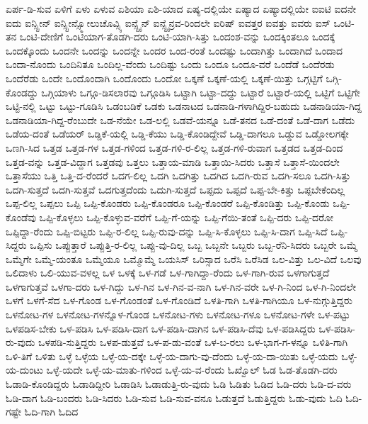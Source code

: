 {ಏರ್ಪ-ಡಿ-ಸುವ
ಏಳಿಗೆ
ಏಳು
ಏಳುವ
ಏಶಿಯಾ
ಏಶಿ-ಯಾದ
ಏಷ್ಯ-ದಲ್ಲಿಯೇ
ಏಷ್ಯಾದ
ಏಷ್ಯಾದಲ್ಲಿಯೇ
ಐಐಟಿ
ಐದನೇ
ಐದು
ಐನ್ಸ್ಟೀನ್
ಐನ್ಸ್ಟೀನ್ಸ್ಮೋಲುಚೊವ್ಸ್ಕಿ
ಐನ್ಸ್ಟೈನ್
ಐನ್ಸ್ಟೈನ್ರವ-ರಿಂದಲೇ
ಐರಿಷ್
ಐವತ್ತರ
ಐವತ್ತು
ಐವರು
ಐಸ್
ಒಂಟಿ-ತನ
ಒಂಟಿ-ದೇಣಿಗೆ
ಒಂಟಿಯಾಗ-ತೊಡಗಿ-ದರು
ಒಂಟಿ-ಯಾಗಿ-ಸಿತ್ತು
ಒಂದಂಶ-ವನ್ನು
ಒಂದಕ್ಕಿಂತಲೂ
ಒಂದಕ್ಕೆ
ಒಂದಕ್ಕೊಂದು
ಒಂದನೇ
ಒಂದನ್ನು
ಒಂದನ್ನೇ
ಒಂದರ
ಒಂದ-ರಂತೆ
ಒಂದಷ್ಟು
ಒಂದಾಗಿತ್ತು
ಒಂದಾಗಿದೆ
ಒಂದಾದ
ಒಂದಾ-ನೊಂದು
ಒಂದಿನಿತೂ
ಒಂದಿಲ್ಲ-ವೆಂದು
ಒಂದಿಷ್ಟು
ಒಂದು
ಒಂದೂ
ಒಂದೂ-ವರೆ
ಒಂದೆಡೆ
ಒಂದೆರಡು
ಒಂದೆರೆಡು
ಒಂದೇ
ಒಂದೊಂದಾಗಿ
ಒಂದೊಂದು
ಒಂದೋ
ಒಕ್ಕಣೆ
ಒಕ್ಕಣೆ-ಯಲ್ಲಿ
ಒಕ್ಕಣೆ-ಯಿತ್ತು
ಒಗ್ಗಟ್ಟಿಗೆ
ಒಗ್ಗಿ-ಕೊಂಡದ್ದು
ಒಗ್ಗಿಯಾಳು
ಒಗ್ಗೂ-ಡಿಸಲಾರವು
ಒಗ್ಗೂಡಿಸಿ
ಒಟ್ಟಾಗಿ
ಒಟ್ಟಾ-ದದ್ದು
ಒಟ್ಟಾರೆ
ಒಟ್ಟಾರೆ-ಯಲ್ಲಿ
ಒಟ್ಟಿಗೆ
ಒಟ್ಟಿಗೇ
ಒಟ್ಟಿ-ನಲ್ಲಿ
ಒಟ್ಟು
ಒಟ್ಟು-ಗೂಡಿಸಿ
ಒಡಂಬಡಿಕೆ
ಒಡಕು
ಒಡನಾಟದ
ಒಡನಾಡಿ-ಗಳಾಗಿದ್ದಿರ-ಬಹುದು
ಒಡನಾಡಿಯಾ-ಗಿದ್ದ
ಒಡನಾಡಿಯಾ-ಗಿದ್ದ-ರೆಂಬುದೇ
ಒಡ-ನೆಯೇ
ಒಡ-ಲಲ್ಲಿ
ಒಡವೆ-ಯನ್ನೂ
ಒಡೆ-ತನದ
ಒಡೆ-ದಂತೆ
ಒಡೆ-ದಾಗ
ಒಡೆದು
ಒಡೆಯ-ದಂತೆ
ಒಡೆಯರ್
ಒಡ್ಡಿಕೆ-ಯಲ್ಲಿ
ಒಡ್ಡಿ-ಕೆಯು
ಒಡ್ಡಿ-ಕೊಂಡಿದ್ದೇವೆ
ಒಡ್ಡಿ-ದಾಗಲೂ
ಒಡ್ಡುವ
ಒಡ್ಡೋಲಗಕ್ಕೇ
ಒಣಗಿ-ಸಿದ
ಒತ್ತಡ
ಒತ್ತಡ-ಗಳ
ಒತ್ತಡ-ಗಳಿಂದ
ಒತ್ತಡ-ಗಳಿ-ರ-ಲಿಲ್ಲ
ಒತ್ತಡ-ಗಳಿ-ರುವಾಗ
ಒತ್ತಡದ
ಒತ್ತಡ-ದಿಂದ
ಒತ್ತಡ-ವನ್ನು
ಒತ್ತಡ-ವಿದ್ದಾಗ
ಒತ್ತಡವು
ಒತ್ತಲು
ಒತ್ತಾಯ-ಮಾಡಿ
ಒತ್ತಾಯಿ-ಸಿದರು
ಒತ್ತಾಸೆ
ಒತ್ತಾಸೆ-ಯಿಂದಲೇ
ಒತ್ತಾಸೆಯು
ಒತ್ತಿ
ಒತ್ತಿ-ದ-ರೆಂದರೆ
ಒದಗ-ಲಿಲ್ಲ
ಒದಗಿ
ಒದಗಿತ್ತು
ಒದಗಿದ
ಒದಗಿ-ರುವ
ಒದಗಿ-ಸಲೂ
ಒದಗಿ-ಸಿತ್ತು
ಒದಗಿ-ಸುತ್ತದೆ
ಒದಗಿ-ಸುತ್ತವೆ
ಒದಗುತ್ತದೆಂದು
ಒದುಗಿ-ಸುತ್ತದೆ
ಒಪ್ಪದು
ಒಪ್ಪದೆ
ಒಪ್ಪ-ಬೇ-ಕಿತ್ತು
ಒಪ್ಪಬೇಕೆಂದಿಲ್ಲ
ಒಪ್ಪ-ಲಿಲ್ಲ
ಒಪ್ಪಲು
ಒಪ್ಪಿ
ಒಪ್ಪಿ-ಕೊಂಡರು
ಒಪ್ಪಿ-ಕೊಂಡರೂ
ಒಪ್ಪಿ-ಕೊಂಡರೆ
ಒಪ್ಪಿ-ಕೊಂಡಿತ್ತು
ಒಪ್ಪಿ-ಕೊಂಡು
ಒಪ್ಪಿ-ಕೊಂಡೆವು
ಒಪ್ಪಿ-ಕೊಳ್ಳಲು
ಒಪ್ಪಿ-ಕೊಳ್ಳುವ-ವರೆಗೆ
ಒಪ್ಪಿ-ಗೆ-ಯನ್ನು
ಒಪ್ಪಿ-ಗೆಯಿ-ತಂತೆ
ಒಪ್ಪಿ-ದರು
ಒಪ್ಪಿ-ದರೋ
ಒಪ್ಪಿದ್ದಾ-ರೆಂದು
ಒಪ್ಪಿ-ಬಿಟ್ಟರು
ಒಪ್ಪಿ-ರ-ಲಿಲ್ಲ
ಒಪ್ಪಿ-ರುವು-ದನ್ನು
ಒಪ್ಪಿ-ಸಿ-ಕೊಳ್ಳಲು
ಒಪ್ಪಿ-ಸಿ-ದಾಗ
ಒಪ್ಪಿ-ಸಿದೆ
ಒಪ್ಪಿ-ಸಿದ್ದರು
ಒಪ್ಪಿಸು
ಒಪ್ಪುತ್ತಾರೆ
ಒಪ್ಪುತ್ತಿ-ರ-ಲಿಲ್ಲ
ಒಪ್ಪು-ವು-ದಿಲ್ಲ
ಒಬ್ಬ
ಒಬ್ಬನೇ
ಒಬ್ಬರು
ಒಬ್ಬ-ರೆನಿ-ಸಿದರು
ಒಬ್ಬರೇ
ಒಮ್ಮೆ
ಒಮ್ಮೆಗೇ
ಒಮ್ಮೆ-ಯಂತೂ
ಒಮ್ಮೆಯೂ
ಒಮ್ಮೊಮ್ಮೆ
ಒಯಸಿಸ್
ಒರಿಸ್ಸಾದ
ಒರೆಸಿ
ಒರೆಸಿಡ
ಒಲ-ವಿತ್ತು
ಒಲ-ವಿದೆ
ಒಲವು
ಒಲಿದಾಳು
ಒಲಿ-ಯುವ-ವಳಲ್ಲ
ಒಳ
ಒಳಕ್ಕೆ
ಒಳ-ಗಡೆ
ಒಳ-ಗಾಗಿದ್ದಾ-ರೆಂದು
ಒಳ-ಗಾಗಿ-ರುವ
ಒಳಗಾಗುತ್ತದೆ
ಒಳಗಾಗುತ್ತವೆ
ಒಳಗಾ-ದರು
ಒಳ-ಗಿದ್ದು
ಒಳ-ಗಿನ
ಒಳ-ಗಿನ-ವ-ನಾಗಿ
ಒಳ-ಗಿನ-ವರೇ
ಒಳ-ಗಿ-ನಿಂದ
ಒಳ-ಗಿ-ನಿಂದಲೇ
ಒಳಗೆ
ಒಳಗೆ-ಸೆದ
ಒಳ-ಗೊಂಡ
ಒಳ-ಗೊಂಡಂತೆ
ಒಳ-ಗೊಂಡಿದೆ
ಒಳತಿ-ಗಾಗಿ
ಒಳತಿ-ಗಾಗಿಯೂ
ಒಳ-ನುಗ್ಗುತ್ತಿದ್ದರು
ಒಳನೋಟ-ಗಳ
ಒಳನೋಟ-ಗಳನ್ನೊಳ-ಗೊಂಡ
ಒಳನೋಟ-ಗಳು
ಒಳನೋಟ-ಗಳೂ
ಒಳನೋಟ-ಗಳೇ
ಒಳ-ಪಟ್ಟು
ಒಳಪಡಿಸ-ಬೇಕು
ಒಳ-ಪಡಿಸಿ
ಒಳ-ಪಡಿಸಿ-ದಾಗ
ಒಳ-ಪಡಿಸಿ-ದಾಗಿನ
ಒಳ-ಪಡಿಸಿ-ದೆವು
ಒಳ-ಪಡಿಸಿದ್ದರು
ಒಳ-ಪಡಿಸಿ-ರು-ವುದು
ಒಳಪಡಿ-ಸುತ್ತಿದ್ದರು
ಒಳಪ-ಡುತ್ತವೆ
ಒಳ-ಪ-ಡು-ವಂತೆ
ಒಳ-ಬ-ರಲು
ಒಳ-ಭಾಗ-ಗ-ಳನ್ನೂ
ಒಳಿತಿ-ಗಾಗಿ
ಒಳಿ-ತಿಗೆ
ಒಳಿತು
ಒಳ್ಳೆ
ಒಳ್ಳೆಯ
ಒಳ್ಳೆ-ಯ-ದಕ್ಕೇ
ಒಳ್ಳೆ-ಯ-ದಾಗು-ವು-ದೆಂದು
ಒಳ್ಳೆ-ಯ-ದಾ-ಯಿತು
ಒಳ್ಳೆ-ಯದು
ಒಳ್ಳೆ-ಯ-ದುಂಟು
ಒಳ್ಳೆ-ಯದೇ
ಒಳ್ಳೆ-ಯ-ಮಾತು-ಗಳಿಂದ
ಒಳ್ಳೆ-ಯ-ವ-ರೆಂದು
ಓಖ್ವೊಲ್
ಓಡ
ಓಡ-ತೊಡಗಿ-ದರು
ಓಡಾಡಿ-ಕೊಂಡಿದ್ದರು
ಓಡಾಡಿದ್ದೀರಿ
ಓಡಾಡಿಸಿ
ಓಡಾಡುತ್ತಿ-ರು-ವುದು
ಓಡಿ
ಓಡಿತು
ಓಡಿದ
ಓಡಿ-ದರು
ಓಡಿ-ದ-ವರು
ಓಡಿ-ದಾಗ
ಓಡಿ-ಬಂದರು
ಓಡಿ-ಸಿದರು
ಓಡಿ-ಸುವ
ಓಡಿ-ಸುವ-ವನೂ
ಓಡುತ್ತದೆ
ಓಡುತ್ತಿದ್ದರು
ಓಡು-ವುದು
ಓದಿ
ಓದಿ-ಗಷ್ಟೇ
ಓದಿ-ಗಾಗಿ
ಓದಿದ
}
